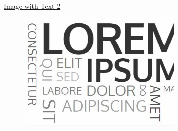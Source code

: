 \documentclass{article}
\begin{document}
\begin{center}
    \Large \underline {Image with Text-2}
\end{center}

\begin{figure}[h] %
\includegraphics[width=8cm]{Lorem} 
\centering 
\end{figure} 
\end{document}
